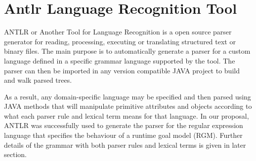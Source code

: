 
\section{Antlr Language Recognition Tool}

ANTLR or Another Tool for Language Recognition is a open source parser generator for reading, processing, executing or translating structured text or binary files. The main purpose is to automatically generate a parser for a custom language defined in a specific grammar language supported by the tool. The parser can then be imported in any version compatible JAVA project to build and walk parsed trees. 

As a result, any domain-specific language may be specified and then parsed using JAVA methods that will manipulate primitive attributes and objects according to what each parser rule and lexical term means for that language. In our proposal, ANTLR was successfully used to generate the parser for the regular expression language that specifies the behaviour of a runtime goal model (RGM). Further details of the grammar with both parser rules and lexical terms is given in later section.
